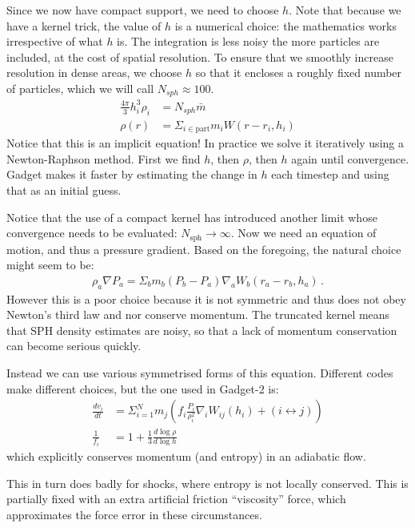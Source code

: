 \documentclass[12pt]{article}
\begin{document}
Since we now have compact support, we need to choose $h$. Note that because we have a kernel trick, the value of $h$ is a numerical choice: the mathematics works irrespective of what $h$ is. The integration is less noisy the more particles are included, at the cost of spatial resolution. To ensure that we smoothly increase resolution in dense areas, we choose $h$ so that it encloses a roughly fixed number of particles, which we will call $N_{sph} \approx 100$.
\begin{align}
\frac{4\pi}{3} h^3_i \rho_i &= N_{sph} \bar{m} \\
 \rho(r) &= \Sigma_{i \in \mathrm{part}} m_i W(r-r_i, h_i)
\end{align}
Notice that this is an implicit equation! In practice we solve it iteratively using a Newton-Raphson method. First we find $h$, then $\rho$, then $h$ again until convergence. Gadget makes it faster by estimating the change in $h$ each timestep and using that as an initial guess.

Notice that the use of a compact kernel has introduced another limit whose convergence needs to be evaluated: $N_\mathrm{sph} \to \infty$. Now we need an equation of motion, and thus a pressure gradient. Based on the foregoing, the natural choice might seem to be:
\begin{align}
\rho_a \nabla P_a = \Sigma_b m_b (P_b - P_a ) \nabla_a W_b(r_a - r_b, h_a)\,.
\end{align}
However this is a poor choice because it is not symmetric and thus does not obey Newton's third law and nor conserve momentum. The truncated kernel means that SPH density estimates are noisy, so that a lack of momentum conservation can become serious quickly.

Instead we can use various symmetrised forms of this equation. Different codes make different choices, but the one used in Gadget-2 is:
\begin{align}
\frac{d v_i}{dt} &= \Sigma_{i=1}^N m_j\left( f_i \frac{P_i}{\rho_i^2} \nabla_i W_{i j} (h_i) + (i \leftrightarrow j)\right) \\
\frac{1}{f_i} &= 1 + \frac{1}{3} \frac{d \log \rho}{d \log h}
\end{align}
which explicitly conserves momentum (and entropy) in an adiabatic flow.

This in turn does badly for shocks, where entropy is not locally conserved. This is partially fixed with an extra artificial friction ``viscosity'' force, which approximates the force error in these circumstances.
\end{document}
